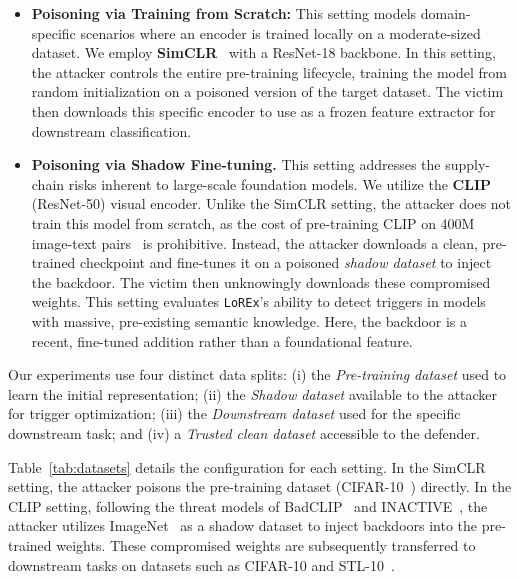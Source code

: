\documentclass[letterpaper,twocolumn,10pt]{article}
\newcommand{\nhat}[1]{\textcolor{red}{Nhat: #1}}
\newcommand{\mn}[1]{\textcolor{orange!90!black}{Mahmoud: #1}}
\begin{document}
\begin{itemize}[leftmargin=0pt]
    \item \textbf{Poisoning via Training from Scratch:} 
    This setting models domain-specific scenarios where an encoder is trained locally on a moderate-sized dataset. We employ \textbf{SimCLR}~\cite{chen2020simclr} with a ResNet-18 backbone. In this setting, the attacker controls the entire pre-training lifecycle, training the model from random initialization on a poisoned version of the target dataset. The victim then downloads this specific encoder to use as a frozen feature extractor for downstream classification.
    
    \item \textbf{Poisoning via Shadow Fine-tuning.} 
    This setting addresses the supply-chain risks inherent to large-scale foundation models. We utilize the \textbf{CLIP}~\cite{CLIP} (ResNet-50) visual encoder. Unlike the SimCLR setting, the attacker does not train this model from scratch, as the cost of pre-training CLIP on 400M image-text pairs~\cite{wit} is prohibitive. Instead, the attacker downloads a clean, pre-trained checkpoint and fine-tunes it on a poisoned \textit{shadow dataset} to inject the backdoor. The victim then unknowingly downloads these compromised weights. This setting evaluates \texttt{LoREx}'s ability to detect triggers in models with massive, pre-existing semantic knowledge. Here, the backdoor is a recent, fine-tuned addition rather than a foundational feature.
\end{itemize}

Our experiments use four distinct data splits: (i) the \textit{Pre-training dataset} used to learn the initial representation; (ii) the \textit{Shadow dataset} available to the attacker for trigger optimization; (iii) the \textit{Downstream dataset} used for the specific downstream task; and (iv) a \textit{Trusted clean dataset} accessible to the defender.

Table~\ref{tab:datasets} details the configuration for each setting. In the SimCLR setting, the attacker poisons the pre-training dataset (CIFAR-10~\cite{cifar10}) directly. In the CLIP setting, following the threat models of BadCLIP~\cite{liang2024badclip} and INACTIVE~\cite{zhang2025invisible}, the attacker utilizes ImageNet~\cite{imagenet} as a shadow dataset to inject backdoors into the pre-trained weights. These compromised weights are subsequently transferred to downstream tasks on datasets such as CIFAR-10 and STL-10~\cite{stl10}.
\end{document}
